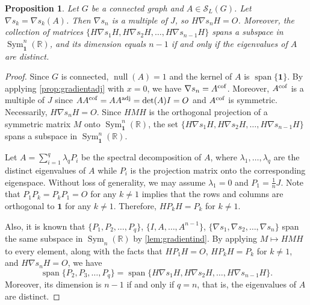\documentclass{article}
\newtheorem{proposition}[theorem]{Proposition}
\theoremstyle{definition}
\newcommand{\adj}{^{\rm adj}}
\newcommand{\cof}{^{\rm cof}}
\newcommand{\bone}{\mathbf{1}}
\newcommand{\nul}{\operatorname{null}}
\newcommand{\vspan}{\operatorname{span}}
\newcommand{\msym}[1][n]{\operatorname{Sym}_{#1}(\mathbb{R})}
\newcommand{\msymz}[1][n]{\operatorname{Sym}_{\bone}^{#1}(\mathbb{R})}
\newcommand{\mptn}{\mathcal{S}}
\begin{document}
\begin{proposition}
\label{prop:gradientprojection}
Let $G$ be a connected graph and $A\in\mptn_L(G)$.  Let $\nabla s_k = \nabla s_k(A)$.  Then $\nabla s_n$ is a multiple of $J$, so $H\nabla s_n H = O$.  Moreover, the collection of matrices $\{H\nabla s_1 H, H\nabla s_2 H, \ldots, H\nabla s_{n-1} H\}$ spans a subspace in $\msymz$, and its dimension equals $n-1$ if and only if the eigenvalues of $A$ are distinct.
\end{proposition}
\begin{proof}
Since $G$ is connected, $\nul(A) = 1$ and the kernel of $A$ is $\vspan\{\bone\}$.  By applying \cref{prop:gradientadj} with $x = 0$, we have $\nabla s_n = A\cof$.  Moreover, $A\cof$ is a multiple of $J$ since $AA\cof = AA\adj = \det(A) I = O$ and $A\cof$ is symmetric.  Necessarily, $H\nabla s_n H = O$. Since $HMH$ is the orthogonal projection of a symmetric matrix $M$ onto $\msymz$, the set $\{H\nabla s_1 H, H\nabla s_2 H, \ldots, H\nabla s_{n-1} H\}$ spans a subspace in $\msymz$.

Let $A = \sum_{i=1}^q\lambda_q P_i$ be the spectral decomposition of $A$, where $\lambda_1, \ldots, \lambda_q$ are the distinct eigenvalues of $A$ while $P_i$ is the projection matrix onto the corresponding eigenspace.  Without loss of generality, we may assume $\lambda_1 = 0$ and $P_1 = \frac{1}{n}J$.  Note that $P_1P_k = P_kP_1 = O$ for any $k \neq 1$ implies that the rows and columns are orthogonal to $\bone$ for any $k \neq 1$.  Therefore, $HP_kH = P_k$ for $k \neq 1$.  

Also, it is known that $\{P_1, P_2, \ldots, P_q\}$, $\{I, A, \ldots, A^{n-1}\}$, $\{\nabla s_1, \nabla s_2, \ldots, \nabla s_n\}$ span the same subspace in $\msym$ by \cref{lem:gradientind}.  By applying $M \mapsto HMH$ to every element, along with the facts that $HP_1H = O$, $HP_kH = P_k$ for $k\neq 1$, and $H\nabla s_n H = O$, we have
\[
    \vspan\{P_2, P_3, \ldots, P_q\} = \vspan\{H\nabla s_1 H, H\nabla s_2 H, \ldots, H\nabla s_{n-1} H\}.
\]
Moreover, its dimension is $n-1$ if and only if $q = n$, that is, the eigenvalues of $A$ are distinct.
\end{proof}
\end{document}
